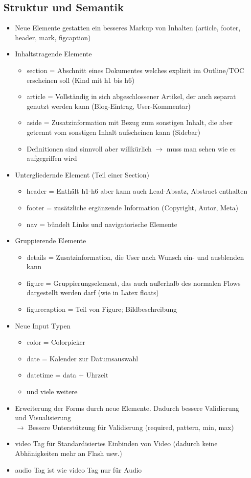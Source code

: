 \documentclass{article} %
\begin{document}
	\subsection{Struktur und Semantik}
	\begin{itemize}
		\item Neue Elemente gestatten ein besseres Markup von Inhalten (article, footer, header, mark, figcaption)
		\item Inhaltstragende Elemente
		\begin{itemize}
			\item section = Abschnitt eines Dokumentes welches explizit im Outline/TOC erscheinen soll (Kind mit h1 bis h6)
			\item article = Vollständig in sich abgeschlossener Artikel, der auch separat genutzt werden kann (Blog-Eintrag, User-Kommentar)
			\item aside = Zusatzinformation mit Bezug zum sonstigen Inhalt, die aber getrennt vom sonstigen Inhalt aufscheinen kann (Sidebar)
			\item Definitionen sind sinnvoll aber willkürlich $\rightarrow$ muss man sehen wie es aufgegriffen wird
		\end{itemize}
		\item Untergliedernde Element (Teil einer Section)
		\begin{itemize}
			\item header = Enthält h1-h6 aber kann auch Lead-Absatz, Abstract enthalten
			\item footer = zusätzliche ergänzende Information (Copyright, Autor, Meta)
			\item nav = bündelt Links und navigatorische Elemente
		\end{itemize}
		\item Gruppierende Elemente
		\begin{itemize}
			\item details = Zusatzinformation, die User nach Wunsch ein- und ausblenden kann
			\item figure = Gruppierungselement, das auch außerhalb des normalen Flows dargestellt werden darf (wie in Latex floats)
			\item figurecaption = Teil von Figure; Bildbeschreibung
		\end{itemize}
		\item Neue Input Typen
		\begin{itemize}
			\item color = Colorpicker
			\item date = Kalender zur Datumsauswahl
			\item datetime = data + Uhrzeit
			\item und viele weitere
		\end{itemize}
		\item Erweiterung der Forms durch neue Elemente. Dadurch bessere Validierung und Visualisierung\\
		$\rightarrow$ Bessere Unterstützung für Validierung (required, pattern, min, max)
		\item video Tag für Standardisiertes Einbinden von Video (dadurch keine Abhänigkeiten mehr an Flash usw.)
		\item audio Tag ist wie video Tag nur für Audio
	\end{itemize}
\end{document}
